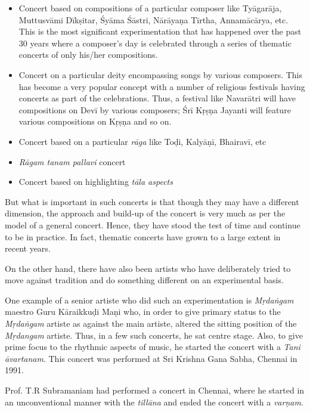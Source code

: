 \begin{itemize}
\itemsep=0pt
\item Concert based on compositions of a particular composer like Tyāgarāja, Muttusvāmi Dīkṣitar, Śyāma Śāstri, Nārāyaṇa Tīrtha, Annamācārya, etc. This is the most significant experimentation that has happened over the past 30 years where a composer’s day is celebrated through a series of thematic concerts of only his/her compositions.

 \item Concert on a particular deity encompassing songs by various composers. This has become a very popular concept with a number of religious festivals having concerts as part of the celebrations. Thus, a festival like Navarātri will have compositions on Devī by various composers; Śrī Kṛṣṇa Jayanti will feature various compositions on Kṛṣṇa and so on.

 \item Concert based on a particular \textit{rāga} like Toḍi, Kalyāṇī, Bhairavī, etc

 \item \textit{Rāgam tanam pallavi} concert

 \item Concert based on highlighting \textit{tāla aspects}

\end{itemize}

But what is important in such concerts is that though they may have a different dimension, the approach and build-up of the concert is very much as per the model of a general concert. Hence, they have stood the test of time and continue to be in practice. In fact, thematic concerts have grown to a large extent in recent years.

On the other hand, there have also been artists who have deliberately tried to move against tradition and do something different on an experimental basis.

One example of a senior artiste who did such an experimentation is \textit{Mṛdaṅgam} maestro Guru Kāraikkuḍi Maṇi who, in order to give primary status to the \textit{Mṛdaṅgam} artiste as against the main artiste, altered the sitting position of the \textit{Mṛdangam} artiste. Thus, in a few such concerts, he sat centre stage. Also, to give prime focus to the rhythmic aspects of music, he started the concert with a \textit{Tani āvartanam}. This concert was performed at Sri Krishna Gana Sabha, Chennai in 1991.

Prof. T.R Subramaniam had performed a concert in Chennai, where he started in an unconventional manner with the \textit{tillāna} and ended the concert with a \textit{varṇam}.

